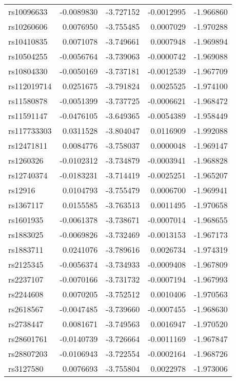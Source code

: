 \documentclass[AMA,STIX1COL,]{WileyNJD-v2}
\begin{document}
\begin{longtable}[t]{lrrrr}
\endfoot
\bottomrule
\endlastfoot
rs10096633 & -0.0089830 & -3.727152 & -0.0012995 & -1.966860\\
rs10260606 & 0.0076950 & -3.755485 & 0.0007029 & -1.970288\\
rs10410835 & 0.0071078 & -3.749661 & 0.0007948 & -1.969894\\
rs10504255 & -0.0056764 & -3.739063 & -0.0000742 & -1.969088\\
rs10804330 & -0.0050169 & -3.737181 & -0.0012539 & -1.967709\\
\addlinespace
rs112019714 & 0.0251675 & -3.791824 & 0.0025525 & -1.974100\\
rs11580878 & -0.0051399 & -3.737725 & -0.0006621 & -1.968472\\
rs11591147 & -0.0476105 & -3.649365 & -0.0054389 & -1.958449\\
rs117733303 & 0.0311528 & -3.804047 & 0.0116909 & -1.992088\\
rs12471811 & 0.0084776 & -3.758037 & 0.0000048 & -1.969147\\
\addlinespace
rs1260326 & -0.0102312 & -3.734879 & -0.0003941 & -1.968828\\
rs12740374 & -0.0183231 & -3.714419 & -0.0025251 & -1.965207\\
rs12916 & 0.0104793 & -3.755479 & 0.0006700 & -1.969941\\
rs1367117 & 0.0155585 & -3.763513 & 0.0011495 & -1.970658\\
rs1601935 & -0.0061378 & -3.738671 & -0.0007014 & -1.968655\\
\addlinespace
rs1883025 & -0.0069826 & -3.732469 & -0.0013153 & -1.967173\\
rs1883711 & 0.0241076 & -3.789616 & 0.0026734 & -1.974319\\
rs2125345 & -0.0056374 & -3.734933 & -0.0009408 & -1.967809\\
rs2237107 & -0.0070166 & -3.731732 & -0.0007194 & -1.967993\\
rs2244608 & 0.0070205 & -3.752512 & 0.0010406 & -1.970563\\
\addlinespace
rs2618567 & -0.0047485 & -3.739660 & -0.0007455 & -1.968630\\
rs2738447 & 0.0081671 & -3.749563 & 0.0016947 & -1.970520\\
rs28601761 & -0.0140739 & -3.726664 & -0.0011169 & -1.967847\\
rs28807203 & -0.0106943 & -3.722554 & -0.0002164 & -1.968726\\
rs3127580 & 0.0076693 & -3.755804 & 0.0022978 & -1.973006\\

\end{longtable}
\end{document}
